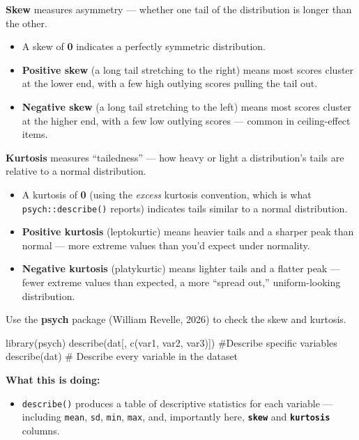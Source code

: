 \documentclass[
  letterpaper,
  DIV=11,
  numbers=noendperiod]{scrreprt}
\newenvironment{Shaded}{\begin{snugshade}}{\end{snugshade}}
\newcommand{\CommentTok}[1]{\textcolor[rgb]{0.37,0.37,0.37}{#1}}
\newcommand{\FunctionTok}[1]{\textcolor[rgb]{0.28,0.35,0.67}{#1}}
\newcommand{\NormalTok}[1]{\textcolor[rgb]{0.00,0.23,0.31}{#1}}
\providecommand{\tightlist}{%
  \setlength{\itemsep}{0pt}\setlength{\parskip}{0pt}}\usepackage{longtable,booktabs,array}
\begin{document}
\textbf{Skew} measures asymmetry --- whether one tail of the
distribution is longer than the other.

\begin{itemize}
\item
  A skew of \textbf{0} indicates a perfectly symmetric distribution.
\item
  \textbf{Positive skew} (a long tail stretching to the right) means
  most scores cluster at the lower end, with a few high outlying scores
  pulling the tail out.
\item
  \textbf{Negative skew} (a long tail stretching to the left) means most
  scores cluster at the higher end, with a few low outlying scores ---
  common in ceiling-effect items.
\end{itemize}

\textbf{Kurtosis} measures ``tailedness'' --- how heavy or light a
distribution's tails are relative to a normal distribution.

\begin{itemize}
\item
  A kurtosis of \textbf{0} (using the \emph{excess} kurtosis convention,
  which is what \texttt{psych::describe()} reports) indicates tails
  similar to a normal distribution.
\item
  \textbf{Positive kurtosis} (leptokurtic) means heavier tails and a
  sharper peak than normal --- more extreme values than you'd expect
  under normality.
\item
  \textbf{Negative kurtosis} (platykurtic) means lighter tails and a
  flatter peak --- fewer extreme values than expected, a more ``spread
  out,'' uniform-looking distribution.
\end{itemize}

Use the \textbf{psych} package (William Revelle, 2026) to check the skew
and kurtosis.

\begin{Shaded}
\begin{Highlighting}[]
\FunctionTok{library}\NormalTok{(psych) }\FunctionTok{describe}\NormalTok{(dat[, }\FunctionTok{c}\NormalTok{(var1, var2, var3)]) }\CommentTok{\#Describe specific variables describe(dat) \# Describe every variable in the dataset}
\end{Highlighting}
\end{Shaded}

\textbf{What this is doing:}

\begin{itemize}
\tightlist
\item
  \texttt{describe()} produces a table of descriptive statistics for
  each variable --- including \texttt{mean}, \texttt{sd}, \texttt{min},
  \texttt{max}, and, importantly here, \textbf{\texttt{skew}} and
  \textbf{\texttt{kurtosis}} columns.
\end{itemize}
\end{document}
